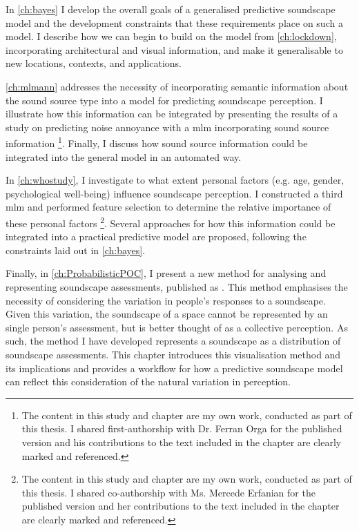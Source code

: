 \documentclass[twoside,fontsize=11pt,titlepage,chapterprefix=true
]{scrbook}
\begin{document}
In \cref{ch:bayes} I develop the overall goals of a generalised predictive soundscape model and the development constraints that these requirements place on such a model. I describe how we can begin to build on the model from \cref{ch:lockdown}, incorporating architectural and visual information, and make it generalisable to new locations, contexts, and applications.

\cref{ch:mlmann} addresses the necessity of incorporating semantic information about the sound source type into a model for predicting soundscape perception. I illustrate how this information can be integrated by presenting the results of a study on predicting noise annoyance with a \gls{mlm} incorporating sound source information \citep{Orga2021Multilevel}\footnote{The content in this study and chapter are my own work, conducted as part of this thesis. I shared first-authorship with Dr. Ferran Orga for the published version and his contributions to the text included in the chapter are clearly marked and referenced.}. Finally, I discuss how sound source information could be integrated into the general model in an automated way.

In \cref{ch:whostudy}, I investigate to what extent personal factors (e.g. age, gender, psychological well-being) influence soundscape perception. I constructed a third \gls{mlm} and performed feature selection to determine the relative importance of these personal factors \citep{Erfanian2021Psychological}\footnote{The content in this study and chapter are my own work, conducted as part of this thesis. I shared co-authorship with Ms. Mercede Erfanian for the published version and her contributions to the text included in the chapter are clearly marked and referenced.}. Several approaches for how this information could be integrated into a practical predictive model are proposed, following the constraints laid out in \cref{ch:bayes}.

Finally, in \cref{ch:ProbabilisticPOC}, I present a new method for analysing and representing soundscape assessments, published as \citet{Mitchell2022How}. This method emphasises the necessity of considering the variation in people's responses to a soundscape. Given this variation, the soundscape of a space cannot be represented by an single person's assessment, but is better thought of as a collective perception. As such, the method I have developed represents a soundscape as a distribution of soundscape assessments. This chapter introduces this visualisation method and its implications and provides a workflow for how a predictive soundscape model can reflect this consideration of the natural variation in perception.
\end{document}
